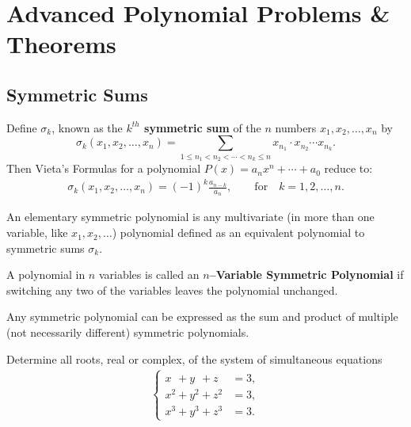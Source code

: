 \section{Advanced Polynomial Problems \& Theorems}

\subsection{Symmetric Sums}

\begin{tcolorbox}[title={Symmetries of Things}]
\begin{definition}
    Define $\sigma_k$, known as the \textbf{$k^{th}$ symmetric sum} of the $n$ numbers $x_1,x_2,\dots,x_n$ by \[\sigma_k(x_1,x_2,\dots,x_n)= \sum_{1\leq n_1 < n_2 < \cdots < n_k \leq n} x_{n_1} \cdot x_{n_2} \cdots x_{n_k}. \]
    Then Vieta's Formulas for a polynomial $P(x)=a_nx^n+\cdots+a_0$ reduce to:
    \begin{align*}
        \sigma_k(x_1,x_2,\dots,x_n) = (-1)^k \frac{a_{n-k}}{a_n},\qquad \text{for} \quad k=1,2,\dots,n.
    \end{align*}
\end{definition}

\begin{definition}
    An elementary symmetric polynomial is any multivariate (in more than one variable, like $x_1, x_2,\dots$) polynomial defined as an equivalent polynomial to symmetric sums $\sigma_k$.
\end{definition}

\begin{definition}
    A polynomial in $n$ variables is called an \textbf{$n$--Variable Symmetric Polynomial} if switching any two of the variables leaves the polynomial unchanged.
\end{definition}
\end{tcolorbox}

\begin{theorem}
Any symmetric polynomial can be expressed as the sum and product of multiple (not necessarily different)
symmetric polynomials.
\end{theorem}




\begin{question}[name={1973 USAMO}]
    Determine all roots, real or complex, of the system of simultaneous equations
    \begin{align*} 
        \begin{cases}
            x\phantom{^2}+y\phantom{^2}+z\phantom{^2} &= 3, \\
        x^2+y^2+z^2 &= 3, \\
        x^3+y^3+z^3 &= 3.
        \end{cases}
    \end{align*}
\end{question}



